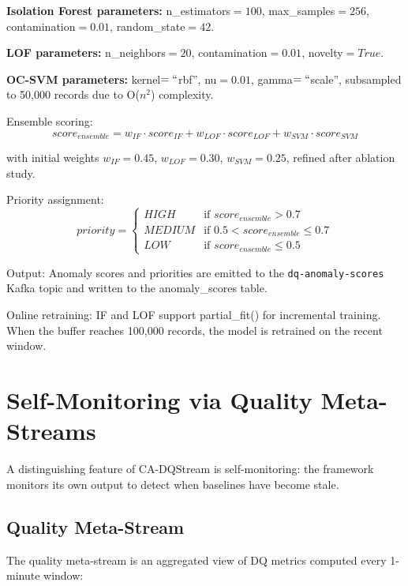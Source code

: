 \textbf{Isolation Forest parameters:} n\_estimators$=100$, max\_samples$=256$, contamination$=0.01$, random\_state$=42$.

\textbf{LOF parameters:} n\_neighbors$=20$, contamination$=0.01$, novelty$=True$.

\textbf{OC-SVM parameters:} kernel$=``$rbf'', nu$=0.01$, gamma$=``$scale'', subsampled to 50,000 records due to O($n^2$) complexity.

Ensemble scoring:
\begin{equation}
score_{ensemble} = w_{IF} \cdot score_{IF} + w_{LOF} \cdot score_{LOF} + w_{SVM} \cdot score_{SVM}
\end{equation}

with initial weights $w_{IF}=0.45$, $w_{LOF}=0.30$, $w_{SVM}=0.25$, refined after ablation study.

Priority assignment:
\begin{equation}
priority = 
\begin{cases}
HIGH & \text{if } score_{ensemble} > 0.7 \\
MEDIUM & \text{if } 0.5 < score_{ensemble} \leq 0.7 \\
LOW & \text{if } score_{ensemble} \leq 0.5
\end{cases}
\end{equation}

Output: Anomaly scores and priorities are emitted to the \texttt{dq-anomaly-scores} Kafka topic and written to the anomaly\_scores table.

Online retraining: IF and LOF support partial\_fit() for incremental training. When the buffer reaches 100,000 records, the model is retrained on the recent window.

\section{Self-Monitoring via Quality Meta-Streams}

A distinguishing feature of CA-DQStream is self-monitoring: the framework monitors its own output to detect when baselines have become stale.

\subsection{Quality Meta-Stream}

The quality meta-stream is an aggregated view of DQ metrics computed every 1-minute window:

